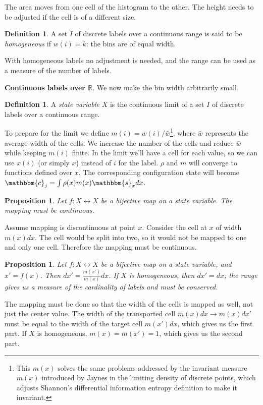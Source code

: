 \documentclass[twocolumn,floatfix,nofootinbib]{revtex4}   %
\theoremstyle{theorem}
\newtheorem{prop}[thm]{Proposition}
\theoremstyle{definition}
\newtheorem{defn}[thm]{Definition}
\begin{document}
The area moves from one cell of the histogram to the other. The height needs to be adjusted if the cell is of a different size.

\begin{defn}\label{discreteHomogeneous}
A set $I$ of discrete labels over a continuous range is said to be \emph{homogeneous} if $w(i)=k$: the bins are of equal width.
\end{defn}

With homogeneous labels no adjustment is needed, and the range can be used as a measure of the number of labels.

\textbf{Continuous labels over $\mathbb{R}$}. We now make the bin width arbitrarily small.

\begin{defn}\label{continuousLabels}
A \emph{state variable} $X$ is the continuous limit of a set $I$ of discrete labels over a continuous range.
\end{defn}

To prepare for the limit we define $m(i)=w(i)/\bar{w}$\footnote{This $m(x)$ solves the same problems addressed by the invariant measure $m(x)$ introduced by Jaynes\cite{Jaynes} in the limiting density of discrete points, which adjusts Shannon's differential information entropy definition to make it invariant.\cite{Shannon}}, where $\bar{w}$ represents the average width of the cells. We increase the number of the cells and reduce $\bar{w}$ while keeping $m(i)$ finite. In the limit we'll have a cell for each value, so we can use $x(i)$ (or simply $x$) instead of $i$ for the label. $\rho$ and $m$ will converge to functions defined over $x$. The corresponding configuration state will become $\mathbbm{c}_j=\int \rho(x) m(x) \mathbbm{s}_x dx$.

\begin{prop}\label{continuousMapping}
Let $f: X \leftrightarrow X$ be a bijective map on a state variable. The mapping must be continuous.
\end{prop}
Assume mapping is discontinuous at point $x$. Consider the cell at $x$ of width $m(x)dx$. The cell would be split into two, so it would not be mapped to one and only one cell. Therefore the mapping must be continuous.

\begin{prop}\label{widthMapping}
Let $f: X \leftrightarrow X$ be a bijective map on a state variable, and $x'=f(x)$. Then $dx' = \frac{m(x')}{m(x)} dx$. If $X$ is homogeneous, then $dx' = dx$; the range gives us a measure of the cardinality of labels and must be conserved.
\end{prop}
The mapping must be done so that the width of the cells is mapped as well, not just the center value. The width of the transported cell $m(x)dx \rightarrow m(x) dx'$ must be equal to the width of the target cell $m(x')dx$, which gives us the first part. If $X$ is homogeneous, $m(x)=m(x')=1$, which gives us the second part.
\end{document}
